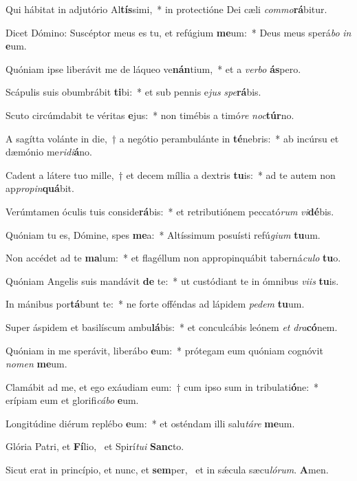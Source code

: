\item Qui hábitat in adjutório Al\textbf{tís}simi,~* in protectióne Dei cæli \textit{com}\textit{mo}\textbf{rá}bitur.
\item Dicet Dómino: Suscéptor meus es tu, et refúgium \textbf{me}um:~* Deus meus sperá\textit{bo} \textit{in} \textbf{e}um.
\item Quóniam ipse liberávit me de láqueo ve\textbf{nán}tium,~* et a \textit{ver}\textit{bo} \textbf{ás}pero.
\item Scápulis suis obumbrábit \textbf{ti}bi:~* et sub pennis e\textit{jus} \textit{spe}\textbf{rá}bis.
\item Scuto circúmdabit te véritas \textbf{e}jus:~* non timébis a timó\textit{re} \textit{noc}\textbf{túr}no.
\item A sagítta volánte in die,~† a negótio perambulánte in \textbf{té}nebris:~* ab incúrsu et dæmónio me\textit{ri}\textit{di}\textbf{á}no.
\item Cadent a látere tuo mille,~† et decem míllia a dextris \textbf{tu}is:~* ad te autem non ap\textit{pro}\textit{pin}\textbf{quá}bit.
\item Verúmtamen óculis tuis conside\textbf{rá}bis:~* et retributiónem peccató\textit{rum} \textit{vi}\textbf{dé}bis.
\item Quóniam tu es, Dómine, spes \textbf{me}a:~* Altíssimum posuísti refú\textit{gi}\textit{um} \textbf{tu}um.
\item Non accédet ad te \textbf{ma}lum:~* et flagéllum non appropinquábit taberná\textit{cu}\textit{lo} \textbf{tu}o.
\item Quóniam Angelis suis mandávit \textbf{de} te:~* ut custódiant te in ómnibus \textit{vi}\textit{is} \textbf{tu}is.
\item In mánibus por\textbf{tá}bunt te:~* ne forte offéndas ad lápidem \textit{pe}\textit{dem} \textbf{tu}um.
\item Super áspidem et basilíscum ambu\textbf{lá}bis:~* et conculcábis leónem \textit{et} \textit{dra}\textbf{có}nem.
\item Quóniam in me sperávit, liberábo \textbf{e}um:~* prótegam eum quóniam cognóvit \textit{no}\textit{men} \textbf{me}um.
\item Clamábit ad me, et ego exáudiam eum:~† cum ipso sum in tribulati\textbf{ó}ne:~* erípiam eum et glorifi\textit{cá}\textit{bo} \textbf{e}um.
\item Longitúdine diérum replébo \textbf{e}um:~* et osténdam illi salu\textit{tá}\textit{re} \textbf{me}um.
\item Glória Patri, et \textbf{Fí}lio,~\psstar{} et Spirí\textit{tu}\textit{i} \textbf{Sanc}to.
\item Sicut erat in princípio, et nunc, et \textbf{sem}per,~\psstar{} et in sǽcula sæcu\textit{ló}\textit{rum}. \textbf{A}men.
